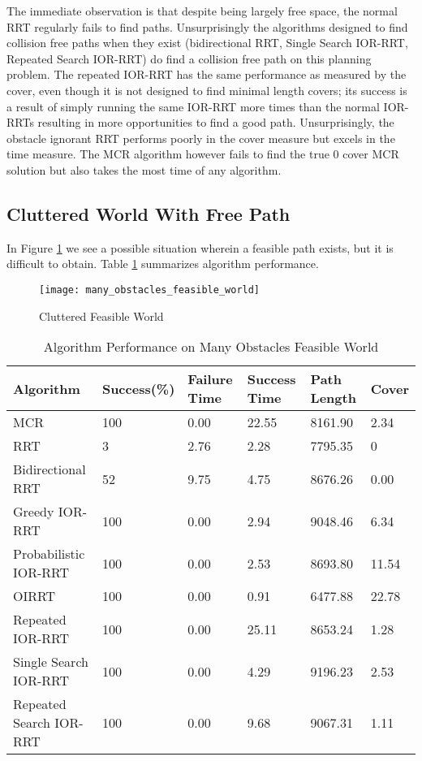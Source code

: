 The immediate observation is that despite being largely free space, the normal RRT regularly fails to find paths. Unsurprisingly the algorithms designed to find collision free paths when they exist (bidirectional RRT, Single Search IOR-RRT, Repeated Search IOR-RRT) do find a collision free path on this planning problem. The repeated IOR-RRT has the same performance as measured by the cover, even though it is not designed to find minimal length covers; its success is a result of simply running the same IOR-RRT more times than the normal IOR-RRTs resulting in more opportunities to find a good path. Unsurprisingly, the obstacle ignorant RRT performs poorly in the cover measure but excels in the time measure. The MCR algorithm however fails to find the true 0 cover MCR solution but also takes the most time of any algorithm.

\subsection{Cluttered World With Free Path}
In Figure \ref{fig:many_obstacles_feasible_world} we see a possible situation wherein a feasible path exists, but it is difficult to obtain. Table \ref{tab:many_obstacles_feasible_world} summarizes algorithm performance.

\begin{figure}[h!]
    \centering
    \texttt{[image: many\_obstacles\_feasible\_world]}
    \caption{Cluttered Feasible World}
    \label{fig:many_obstacles_feasible_world}
\end{figure}


\begin{table}[h!]
\begin{tabular}{@{}llllll@{}}
\toprule
Algorithm & Success(\%)  & Failure Time  & Success Time  & Path Length & Cover\\ 
\midrule
MCR & 100 & 0.00 & 22.55 & 8161.90 & 2.34 \\
RRT & 3 & 2.76 & 2.28 & 7795.35 & 0 \\
Bidirectional RRT & 52 & 9.75 & 4.75 & 8676.26 & 0.00 \\
Greedy IOR-RRT & 100 & 0.00 & 2.94 & 9048.46 & 6.34 \\
Probabilistic IOR-RRT & 100 & 0.00 & 2.53 & 8693.80 & 11.54 \\
OIRRT & 100 & 0.00 & 0.91 & 6477.88 & 22.78 \\
Repeated IOR-RRT & 100 & 0.00 & 25.11 & 8653.24 & 1.28 \\
Single Search IOR-RRT & 100 & 0.00 & 4.29 & 9196.23 & 2.53 \\
Repeated Search IOR-RRT & 100 & 0.00 & 9.68 & 9067.31 & 1.11 \\
\bottomrule
\end{tabular}
\caption{Algorithm Performance on Many Obstacles Feasible World}
\label{tab:many_obstacles_feasible_world}
\end{table}

